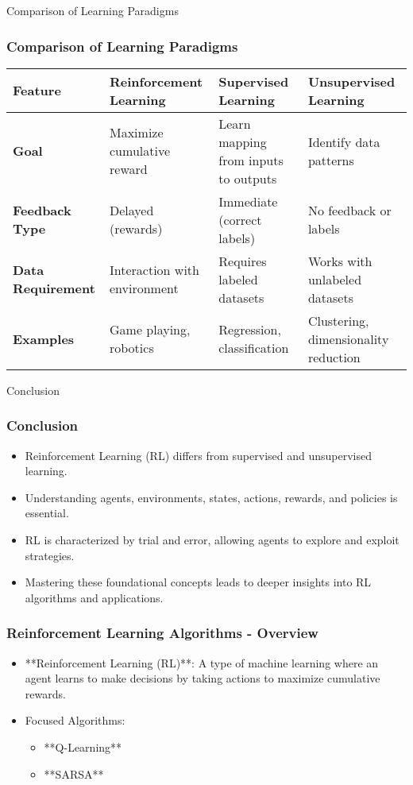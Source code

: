 \documentclass[aspectratio=169]{beamer}
\begin{document}
\begin{frame}[fragile]{Comparison of Learning Paradigms}
    \frametitle{Comparison of Learning Paradigms}
    \begin{table}[ht]
        \centering
        \begin{tabular}{|l|l|l|l|}
            \hline
            \textbf{Feature} & \textbf{Reinforcement Learning} & \textbf{Supervised Learning} & \textbf{Unsupervised Learning} \\ \hline
            \textbf{Goal} & Maximize cumulative reward & Learn mapping from inputs to outputs & Identify data patterns \\ \hline
            \textbf{Feedback Type} & Delayed (rewards) & Immediate (correct labels) & No feedback or labels \\ \hline
            \textbf{Data Requirement} & Interaction with environment & Requires labeled datasets & Works with unlabeled datasets \\ \hline
            \textbf{Examples} & Game playing, robotics & Regression, classification & Clustering, dimensionality reduction \\ \hline
        \end{tabular}
    \end{table}
\end{frame}

\begin{frame}[fragile]{Conclusion}
    \frametitle{Conclusion}
    \begin{itemize}
        \item Reinforcement Learning (RL) differs from supervised and unsupervised learning.
        \item Understanding agents, environments, states, actions, rewards, and policies is essential.
        \item RL is characterized by trial and error, allowing agents to explore and exploit strategies.
        \item Mastering these foundational concepts leads to deeper insights into RL algorithms and applications.
    \end{itemize}
\end{frame}

\begin{frame}[fragile]
    \frametitle{Reinforcement Learning Algorithms - Overview}
    \begin{itemize}
        \item **Reinforcement Learning (RL)**: A type of machine learning where an agent learns to make decisions by taking actions to maximize cumulative rewards.
        \item Focused Algorithms:
        \begin{itemize}
            \item **Q-Learning**
            \item **SARSA**
        \end{itemize}
    \end{itemize}
\end{frame}
\end{document}
